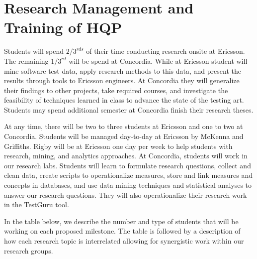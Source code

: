 \section*{Research Management and Training of HQP}

Students will spend $2/3^{rds}$ of their time conducting research onsite at Ericsson. The remaining $1/3^{rd}$ will be spend at Concordia. While at Ericsson student will mine software test data, apply research methods to this data, and present the results through tools to Ericsson engineers. At Concordia they will generalize their findings to other projects, take required courses, and investigate the feasibility of techniques learned in class to advance the state of the testing art. Students may spend additional semester at Concordia finish their research theses.

At any time, there will be two to three students at Ericsson and one to two at Concordia. Students will be managed day-to-day at Ericsson by McKenna and Griffiths. Rigby will be at Ericsson one day per week to help students with research, mining, and analytics approaches. At Concordia, students will work in our research labs.
%
Students will learn to formulate research questions, collect and clean data, create scripts to operationalize measures, store and link measures and concepts in databases, and use data mining techniques and statistical analyses to answer our research questions. They will also operationalize their research work in the TestGuru tool.

In the table below, we describe the number and type of students that will be working on each proposed milestone. The table is followed by a description of how each research topic is interrelated allowing for synergistic work within our research groups.

